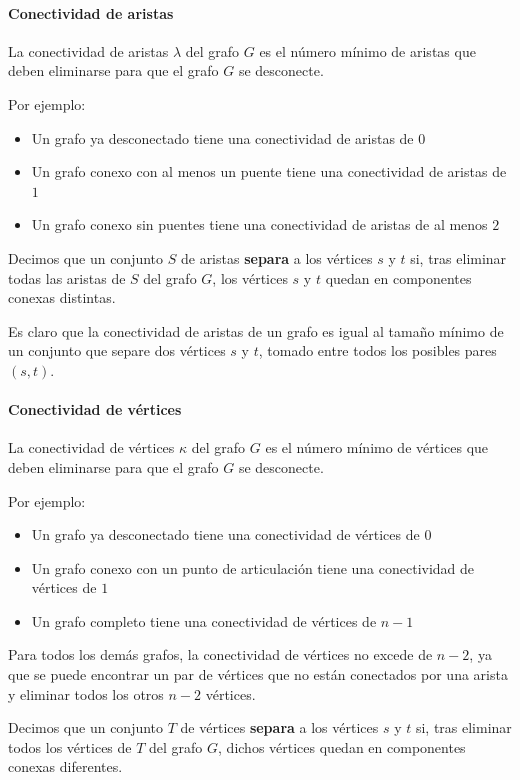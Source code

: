 \documentclass[a4paper]{article}
\begin{document}
\paragraph{Conectividad de aristas}
La conectividad de aristas \(\lambda\) del grafo \(G\) es el número mínimo de aristas que deben eliminarse para que el grafo \(G\) se desconecte.

Por ejemplo:
\begin{itemize}
    \item Un grafo ya desconectado tiene una conectividad de aristas de \(0\)
    \item Un grafo conexo con al menos un puente tiene una conectividad de aristas de \(1\)
    \item Un grafo conexo sin puentes tiene una conectividad de aristas de al menos \(2\)
\end{itemize}

Decimos que un conjunto \(S\) de aristas \textbf{separa} a los vértices \(s\) y \(t\) si, tras eliminar todas las aristas de \(S\) del grafo \(G\), los vértices \(s\) y \(t\) quedan en componentes conexas distintas.

Es claro que la conectividad de aristas de un grafo es igual al tamaño mínimo de un conjunto que separe dos vértices \(s\) y \(t\), tomado entre todos los posibles pares \((s, t)\).

\paragraph{Conectividad de vértices}
La conectividad de vértices \(\kappa\) del grafo \(G\) es el número mínimo de vértices que deben eliminarse para que el grafo \(G\) se desconecte.

Por ejemplo:
\begin{itemize}
    \item Un grafo ya desconectado tiene una conectividad de vértices de \(0\)
    \item Un grafo conexo con un punto de articulación tiene una conectividad de vértices de \(1\)
    \item Un grafo completo tiene una conectividad de vértices de \(n-1\)
\end{itemize}

Para todos los demás grafos, la conectividad de vértices no excede de \(n-2\), ya que se puede encontrar un par de vértices que no están conectados por una arista y eliminar todos los otros \(n-2\) vértices.

Decimos que un conjunto \(T\) de vértices \textbf{separa} a los vértices \(s\) y \(t\) si, tras eliminar todos los vértices de \(T\) del grafo \(G\), dichos vértices quedan en componentes conexas diferentes.
\end{document}
